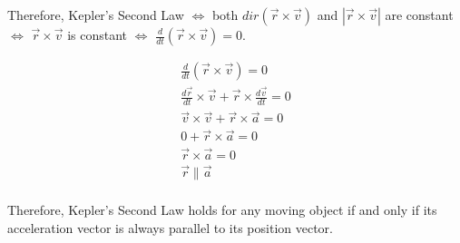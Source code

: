 \documentclass{article}
\begin{document}
Therefore, Kepler's Second Law $\iff$ both $dir(\vec{r} \times \vec{v})$ and 
$|\vec{r} \times \vec{v}|$ are constant $\iff$ $\vec{r} \times \vec{v}$ is 
constant $\iff$ $\frac{d}{dt}(\vec{r} \times \vec{v}) = 0$.

\begin{gather*}
  \frac{d}{dt}(\vec{r} \times \vec{v}) = 0 \\
  \frac{d\vec{r}}{dt} \times \vec{v} + \vec{r} \times \frac{d\vec{v}}{dt} = 0 \\
  \vec{v} \times \vec{v} + \vec{r} \times \vec{a} = 0 \\
  0 + \vec{r} \times \vec{a} = 0 \\
  \vec{r} \times \vec{a} = 0 \\
  \vec{r} \parallel \vec{a} \\
\end{gather*}

Therefore, Kepler's Second Law holds for any moving object if and only if its 
acceleration vector is always parallel to its position vector.
\end{document}
